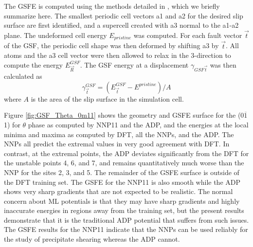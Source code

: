 \documentclass{article}
\begin{document}
The GSFE is computed using the methods detailed in \cite{Yin2017a}, which we briefly summarize here.
The smallest periodic cell vectors a1 and a2 for the desired slip surface are first identified, and a supercell created with a3 normal to the a1-a2 plane.  The undeformed cell energy $E_{pristine}$ was computed.
For each fault vector $\vec{t}$ of the GSF, the periodic cell shape was then deformed by shifting a3 by $\vec{t}$.  All atoms and the a3 cell vector were then allowed to relax in the 3-direction to compute the energy $E^{GSF}_{\vec{R}}$.
The GSF energy at a displacement $\gamma_{GSF\vec{t}}$ was then calculated as 
\begin{equation}
\gamma^{GSF}_{\vec{t}} = (E^{GSF}_{\vec{t}} - E^{pristine})/A
\end{equation}
where $A$ is the area of the slip surface in the simulation cell.

Figure \ref{fig:GSF_Theta_0m11} shows the geometry and GSFE surface for the (0$\overline{1}$1) for $\theta$ phase as computed by NNP11 and the ADP, and the energies at the local minima and maxima as computed by DFT, all the NNPs, and the ADP.  The NNPs all predict the extremal values in very good agreement with DFT.
In contrast, at the extremal points, the ADP deviates significantly from the DFT for the unstable points 4, 6, and 7, and remains quantitatively much worse than the NNP for the sites 2, 3, and 5.  The remainder of the GSFE surface is outside of the DFT training set.  The GSFE for the NNP11 is also smooth while the ADP shows very sharp gradients that are not expected to be realistic.  The normal concern about ML potentials is that they may have sharp gradients and highly inaccurate energies in regions away from the training set, but the present results demonstrate that it is the traditional ADP potential that suffers from such issues.  The GSFE results for the NNP11 indicate that the NNPs can be used reliably for the study of precipitate shearing whereas the ADP cannot.
\end{document}
